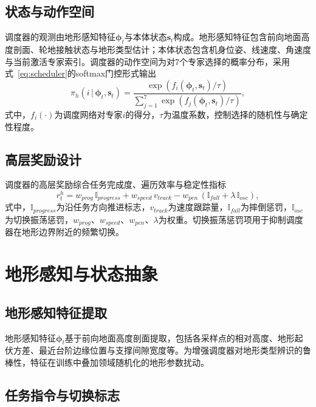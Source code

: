 \subsection{状态与动作空间}

调度器的观测由地形感知特征$\boldsymbol{\phi}_t$与本体状态$\boldsymbol{s}_t$构成。地形感知特征包含前向地面高度剖面、轮地接触状态与地形类型估计；本体状态包含机身位姿、线速度、角速度与当前激活专家索引。调度器的动作空间为对7个专家选择的概率分布，采用式~\eqref{eq:scheduler}的softmax门控形式输出
\begin{equation}
  \pi_h(i\,|\,\boldsymbol{\phi}_t,\boldsymbol{s}_t) = \frac{\exp\left(f_i(\boldsymbol{\phi}_t,\boldsymbol{s}_t)/\tau\right)}{\sum_{j=1}^{7}\exp\left(f_j(\boldsymbol{\phi}_t,\boldsymbol{s}_t)/\tau\right)},
  \label{eq:scheduler-detail}
\end{equation}
式中，$f_i(\cdot)$为调度网络对专家$i$的得分，$\tau$为温度系数，控制选择的随机性与确定性程度。

\subsection{高层奖励设计}

调度器的高层奖励综合任务完成度、遍历效率与稳定性指标
\begin{equation}
  r^h_t = w_{prog}\,\mathbb{I}_{progress} + w_{speed}\,v_{track} - w_{pen}\,\left(\mathbb{I}_{fall} + \lambda\,\mathbb{I}_{osc}\right),
  \label{eq:scheduler-reward}
\end{equation}
式中，$\mathbb{I}_{progress}$为沿任务方向推进标志，$v_{track}$为速度跟踪量，$\mathbb{I}_{fall}$为摔倒惩罚，$\mathbb{I}_{osc}$为切换振荡惩罚，$w_{prog}$、$w_{speed}$、$w_{pen}$、$\lambda$为权重。切换振荡惩罚项用于抑制调度器在地形边界附近的频繁切换。

\section{地形感知与状态抽象}

\subsection{地形感知特征提取}

地形感知特征$\boldsymbol{\phi}_t$基于前向地面高度剖面提取，包括各采样点的相对高度、地形起伏方差、最近台阶边缘位置与支撑间隙宽度等。为增强调度器对地形类型辨识的鲁棒性，特征在训练中叠加领域随机化的地形参数扰动。

\subsection{任务指令与切换标志}

